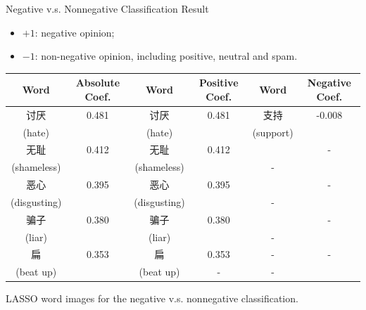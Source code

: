 \documentclass[12pt, trans]{beamer}
\newcommand{\1}[1]{{\mathbf 1}\left\{#1\right\}}        %
\begin{document}
\begin{frame}{Negative v.s. Nonnegative Classification Result}
\begin{itemize}[<+->]
\item $+1$: negative opinion;
\item $-1$: non-negative opinion, including positive, neutral and spam.
\end{itemize}

\tiny
\begin{center}
\begin{tabular}{|c|c||c|c||c|c|}
\hline
Word & Absolute Coef. & Word & Positive Coef. & Word & Negative Coef.\\ \hline \hline
讨厌 & 0.481 & 讨厌 & 0.481 & 支持 & -0.008\\
(hate) & & (hate) & & (support) & \\\hline
无耻 & 0.412 & 无耻 & 0.412 &  & -\\
(shameless) & & (shameless) & & - & \\\hline
恶心 & 0.395 & 恶心 & 0.395 &  & -\\
(disgusting) & & (disgusting) & & - & \\\hline
骗子 & 0.380 & 骗子 & 0.380 &  & -\\
(liar) & & (liar) & & - & \\\hline
扁 & 0.353 & 扁 & 0.353 & - & -\\
(beat up) & & (beat up) &- & - & \\\hline
\end{tabular}
LASSO word images for the negative v.s. nonnegative classification.
\end{center}

\end{frame}


\end{document}
